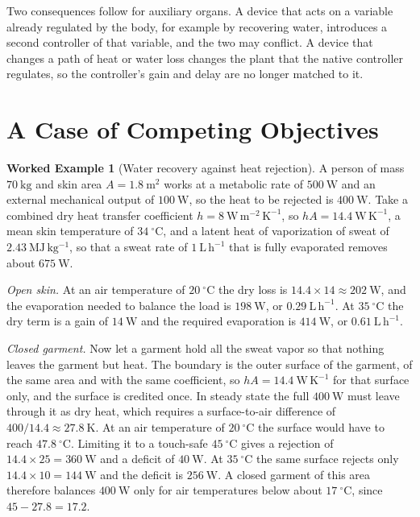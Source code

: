 \documentclass[11pt,openany]{book}
\theoremstyle{definition}
\newtheorem{example}{Worked Example}[chapter]
\theoremstyle{remark}
\begin{document}
Two consequences follow for auxiliary organs. A device that acts on a variable already regulated by the body, for example by recovering water, introduces a second controller of that variable, and the two may conflict. A device that changes a path of heat or water loss changes the plant that the native controller regulates, so the controller's gain and delay are no longer matched to it.

\section{A Case of Competing Objectives}

\begin{example}[Water recovery against heat rejection]
\label{ex:waterheat}
A person of mass $70\ \mathrm{kg}$ and skin area $A=1.8\ \mathrm{m^{2}}$ works at a metabolic rate of $500\ \mathrm{W}$ and an external mechanical output of $100\ \mathrm{W}$, so the heat to be rejected is $400\ \mathrm{W}$. Take a combined dry heat transfer coefficient $h=8\ \mathrm{W\,m^{-2}\,K^{-1}}$, so $hA=14.4\ \mathrm{W\,K^{-1}}$, a mean skin temperature of $34\ ^\circ\mathrm{C}$, and a latent heat of vaporization of sweat of $2.43\ \mathrm{MJ\,kg^{-1}}$, so that a sweat rate of $1\ \mathrm{L\,h^{-1}}$ that is fully evaporated removes about $675\ \mathrm{W}$.

\emph{Open skin.} At an air temperature of $20\ ^\circ\mathrm{C}$ the dry loss is $14.4\times14\approx202\ \mathrm{W}$, and the evaporation needed to balance the load is $198\ \mathrm{W}$, or $0.29\ \mathrm{L\,h^{-1}}$. At $35\ ^\circ\mathrm{C}$ the dry term is a gain of $14\ \mathrm{W}$ and the required evaporation is $414\ \mathrm{W}$, or $0.61\ \mathrm{L\,h^{-1}}$.

\emph{Closed garment.} Now let a garment hold all the sweat vapor so that nothing leaves the garment but heat. The boundary is the outer surface of the garment, of the same area and with the same coefficient, so $hA=14.4\ \mathrm{W\,K^{-1}}$ for that surface only, and the surface is credited once. In steady state the full $400\ \mathrm{W}$ must leave through it as dry heat, which requires a surface-to-air difference of $400/14.4\approx27.8\ \mathrm{K}$. At an air temperature of $20\ ^\circ\mathrm{C}$ the surface would have to reach $47.8\ ^\circ\mathrm{C}$. Limiting it to a touch-safe $45\ ^\circ\mathrm{C}$ gives a rejection of $14.4\times25=360\ \mathrm{W}$ and a deficit of $40\ \mathrm{W}$. At $35\ ^\circ\mathrm{C}$ the same surface rejects only $14.4\times10=144\ \mathrm{W}$ and the deficit is $256\ \mathrm{W}$. A closed garment of this area therefore balances $400\ \mathrm{W}$ only for air temperatures below about $17\ ^\circ\mathrm{C}$, since $45-27.8=17.2$.


\end{example}
\end{document}
